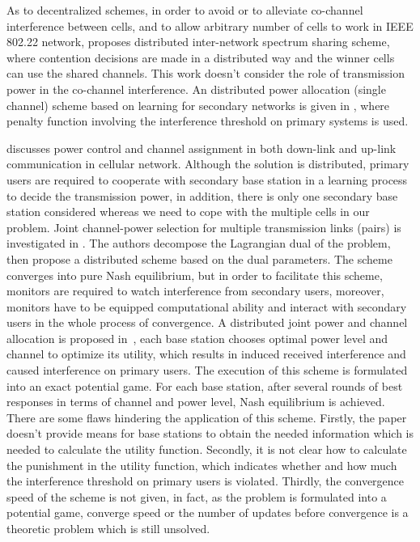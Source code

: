 As to decentralized schemes, in order to avoid or to alleviate co-channel interference between cells, and to allow arbitrary number of cells to work in IEEE 802.22 network, \cite{Inter-Network_Spectrum_Sharing_80222_08} proposes distributed inter-network spectrum sharing scheme, where contention decisions are made in a distributed way and the winner cells can use the shared channels.
This work doesn't consider the role of transmission power in the co-channel interference.
%
An distributed power allocation (single channel) scheme based on learning for secondary networks is given in \cite{aggregatedInf_Galindo_crowncom09}, where penalty function involving the interference threshold on primary systems is used.

\cite{HoangPowerChannel2010} discusses power control and channel assignment in both down-link and up-link communication in cellular network. 
Although the solution is distributed, primary users are required to cooperate with secondary base station in a learning process to decide the transmission power, in addition, there is only one secondary base station considered whereas we need to cope with the multiple cells in our problem.
%
Joint channel-power selection for multiple transmission links (pairs) is investigated in \cite{wuinfocom09}. 
The authors decompose the Lagrangian dual of the problem, then propose a distributed scheme based on the dual parameters. 
The scheme converges into pure Nash equilibrium, but in order to facilitate this scheme, monitors are required to watch interference from secondary users, moreover, monitors have to be equipped computational ability and interact with secondary users in the whole process of convergence.
%
A distributed joint power and channel allocation is proposed in~\cite{pimrc_2012}, each base station chooses optimal power level and channel to optimize its utility, which results in induced received interference and caused interference on primary users. 
The execution of this scheme is formulated into an exact potential game. 
For each base station, after several rounds of best responses in terms of channel and power level, Nash equilibrium is achieved.
There are some flaws hindering the application of this scheme.
Firstly, the paper doesn't provide means for base stations to obtain the needed information which is needed to calculate the utility function.
Secondly, it is not clear how to calculate the punishment in the utility function, which indicates whether and how much the interference threshold on primary users is violated.
Thirdly, the convergence speed of the scheme is not given, in fact, as the problem is formulated into a potential game, converge speed or the number of updates before convergence is a theoretic problem which is still unsolved.
